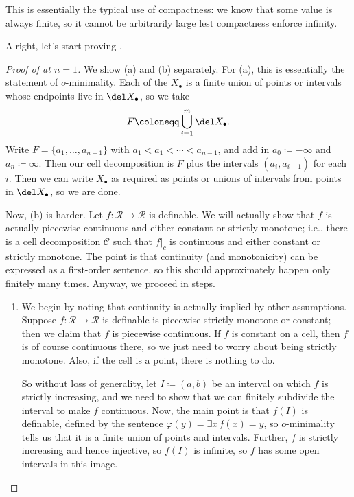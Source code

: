\documentclass[../notes.tex]{subfiles}
\begin{document}
\begin{remark}
	This is essentially the typical use of compactness: we know that some value is always finite, so it cannot be arbitrarily large lest compactness enforce infinity.
\end{remark}
Alright, let's start proving .
\begin{proof}[Proof of  at $n=1$]
	We show (a) and (b) separately. For (a), this is essentially the statement of $o$-minimality. Each of the $X_\bullet$ is a finite union of points or intervals whose endpoints live in $\del X_\bullet$, so we take
	\[F\coloneqq\bigcup_{i=1}^m\del X_\bullet.\]
	Write $F=\{a_1,\ldots,a_{n-1}\}$ with $a_1<a_1<\cdots<a_{n-1}$, and add in $a_0\coloneqq-\infty$ and $a_n\coloneqq\infty$. Then our cell decomposition is $F$ plus the intervals $(a_i,a_{i+1})$ for each $i$. Then we can write $X_\bullet$ as required as points or unions of intervals from points in $\del X_\bullet$, so we are done.

	Now, (b) is harder. Let $f\colon\mathcal R\to\mathcal R$ is definable. We will actually show that $f$ is actually piecewise continuous and either constant or strictly monotone; i.e., there is a cell decomposition $\mathcal C$ such that $f|_c$ is continuous and either constant or strictly monotone. The point is that continuity (and monotonicity) can be expressed as a first-order sentence, so this should approximately happen only finitely many times. Anyway, we proceed in steps.
	\begin{enumerate}
		\item We begin by noting that continuity is actually implied by other assumptions. Suppose $f\colon\mathcal R\to\mathcal R$ is definable is piecewise strictly monotone or constant; then we claim that $f$ is piecewise continuous. If $f$ is constant on a cell, then $f$ is of course continuous there, so we just need to worry about being strictly monotone. Also, if the cell is a point, there is nothing to do.
		
		So without loss of generality, let $I\coloneqq(a,b)$ be an interval on which $f$ is strictly increasing, and we need to show that we can finitely subdivide the interval to make $f$ continuous. Now, the main point is that $f(I)$ is definable, defined by the sentence $\varphi(y)=\exists x\,f(x)=y$, so $o$-minimality tells us that it is a finite union of points and intervals. Further, $f$ is strictly increasing and hence injective, so $f(I)$ is infinite, so $f$ has some open intervals in this image.


\end{enumerate}
\end{proof}
\end{document}

